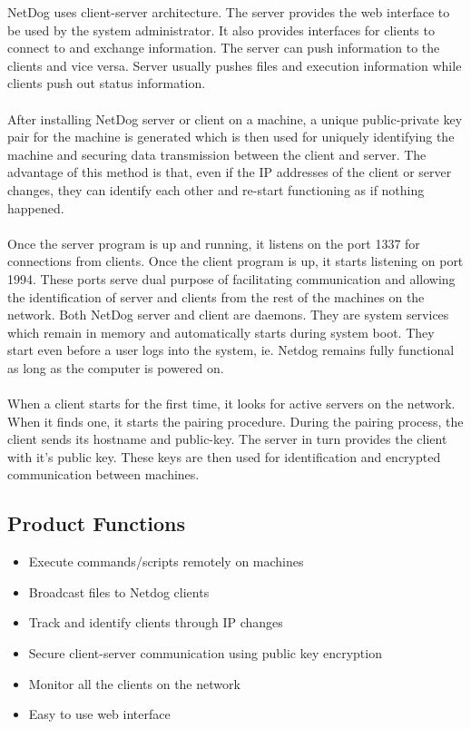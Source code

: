 NetDog uses client-server architecture. The server provides the web interface to
be used by the system administrator. It also provides interfaces for clients to
connect to and exchange information. The server can push information to the
clients and vice versa. Server usually pushes files and execution information
while clients push out status information.
\\\\
After installing NetDog server or client on a machine, a unique public-private
key pair for the machine is generated which is then used for uniquely
identifying the machine and securing data transmission between the client and
server. The advantage of this method is that, even if the IP addresses of the
client or server changes, they can identify each other and re-start functioning
as if nothing happened.
\\\\
Once the server program is up and running, it listens on the port 1337 for
connections from clients. Once the client program is up, it starts listening on
port 1994. These ports serve dual purpose of facilitating communication and
allowing the identification of server and clients from the rest of the machines
on the network. Both NetDog server and client are daemons. They are system 
services which remain in memory and automatically starts during system boot.
They start even before a user logs into the system, ie. Netdog remains fully
functional as long as the computer is powered on.
\\\\
When a client starts for the first time, it looks for active servers on the
network. When it finds one, it starts the pairing procedure. During the pairing
process, the client sends its hostname and public-key. The server in turn
provides the client with it's public key. These keys are then used for
identification and encrypted communication between machines.

\subsection{Product Functions}
\begin{itemize}
    \item Execute commands/scripts remotely on machines
    \item Broadcast files to Netdog clients 
    \item Track and identify clients through IP changes
    \item Secure client-server communication using public key encryption
    \item Monitor all the clients on the network 
    \item Easy to use web interface
\end{itemize}

